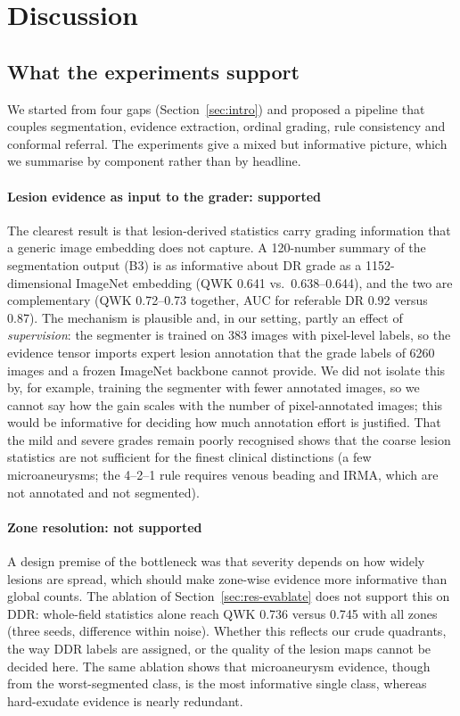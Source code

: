 \section{Discussion}
\label{sec:discussion}

\subsection{What the experiments support}
We started from four gaps (Section~\ref{sec:intro}) and proposed a pipeline that couples segmentation, evidence extraction, ordinal grading, rule consistency and conformal referral. The experiments give a mixed but informative picture, which we summarise by component rather than by headline.

\paragraph{Lesion evidence as input to the grader: supported} The clearest result is that lesion-derived statistics carry grading information that a generic image embedding does not capture. A 120-number summary of the segmentation output (B3) is as informative about DR grade as a 1152-dimensional ImageNet embedding (QWK 0.641 vs.\ 0.638--0.644), and the two are complementary (QWK 0.72--0.73 together, AUC for referable DR 0.92 versus 0.87). The mechanism is plausible and, in our setting, partly an effect of \emph{supervision}: the segmenter is trained on 383 images with pixel-level labels, so the evidence tensor imports expert lesion annotation that the grade labels of 6260 images and a frozen ImageNet backbone cannot provide. We did not isolate this by, for example, training the segmenter with fewer annotated images, so we cannot say how the gain scales with the number of pixel-annotated images; this would be informative for deciding how much annotation effort is justified. That the mild and severe grades remain poorly recognised shows that the coarse lesion statistics are not sufficient for the finest clinical distinctions (a few microaneurysms; the 4--2--1 rule requires venous beading and IRMA, which are not annotated and not segmented).

\paragraph{Zone resolution: not supported} A design premise of the bottleneck was that severity depends on how widely lesions are spread, which should make zone-wise evidence more informative than global counts. The ablation of Section~\ref{sec:res-evablate} does not support this on DDR: whole-field statistics alone reach QWK 0.736 versus 0.745 with all zones (three seeds, difference within noise). Whether this reflects our crude quadrants, the way DDR labels are assigned, or the quality of the lesion maps cannot be decided here. The same ablation shows that microaneurysm evidence, though from the worst-segmented class, is the most informative single class, whereas hard-exudate evidence is nearly redundant.


